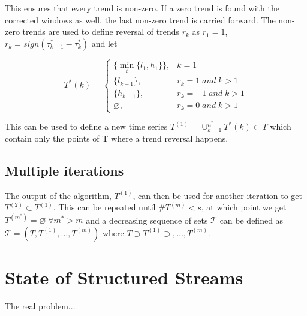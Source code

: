 \documentclass[a4paper, 12pt]{article}
\begin{document}
This ensures that every trend is non-zero. If a zero trend is found with the corrected windows as well, the last non-zero trend is carried forward. The non-zero trends are used to define reversal of trends $r_k$ as $r_1 = 1$, $r_k = sign(\tau_{k-1}^* - \tau_k^*)$ and let

\begin{equation*}
    T^*(k) = \begin{cases}
        \{ \min_t\{l_1, h_1\} \}, & k = 1 \\
        \{ l_{k-1} \}, & r_k = 1 \; and \; k > 1 \\
        \{ h_{k-1} \}, & r_k = -1 \; and \; k > 1 \\
        \varnothing, & r_k = 0 \; and \; k > 1
    \end{cases}
\end{equation*}

This can be used to define a new time series $T^{(1)} = \cup_{k=1}^{n^*} T^*(k) \subset T$ which contain only the points of T where a trend reversal happens.

\subsection{Multiple iterations}

The output of the algorithm, $T^{(1)}$, can then be used for another iteration to get $T^{(2)} \subset T^{(1)}$. This can be repeated until $\#T^{(m)} < s$, at which point we get $T^{(m^*)} = \varnothing \; \forall m^* > m$ and a decreasing sequence of sets $\mathcal{T}$ can be defined as $\mathcal{T} = (T, T^{(1)}, \dots, T^{(m)})$ where $T \supset T^{(1)} \supset, \dots, T^{(m)}$.



\section{State of Structured Streams}

The real problem...
\end{document}
